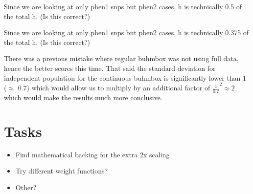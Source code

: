 \documentclass[11pt]{hw-template}
\begin{document}
\begin{table}[h!]
\caption{Pleiotropic Population} 
\end{table}
Since we are looking at only phen1 snps but phen2 cases, h is technically 0.5 of the total h. (Is this correct?)

\begin{table}[h!]
\caption{Heterogeneous Population} 
\end{table}
Since we are looking at only phen1 snps but phen2 cases, h is technically 0.375 of the total h. (Is this correct?)


There was a previous mistake where regular buhmbox was not using full data, hence the better scores this time. That said the standard deviation for independent population for the
continuous buhmbox is significantly lower than 1 ($\approx$ 0.7) which would allow us to multiply by an additional factor of $\frac{1}{0.7}^2 \approx 2$ which would make the results much more
conclusive. 

\section*{Tasks}
\begin{itemize}
  \item Find mathematical backing for the extra 2x scaling
  \item Try different weight functions?
  \item Other?
\end{itemize}
\end{document}
